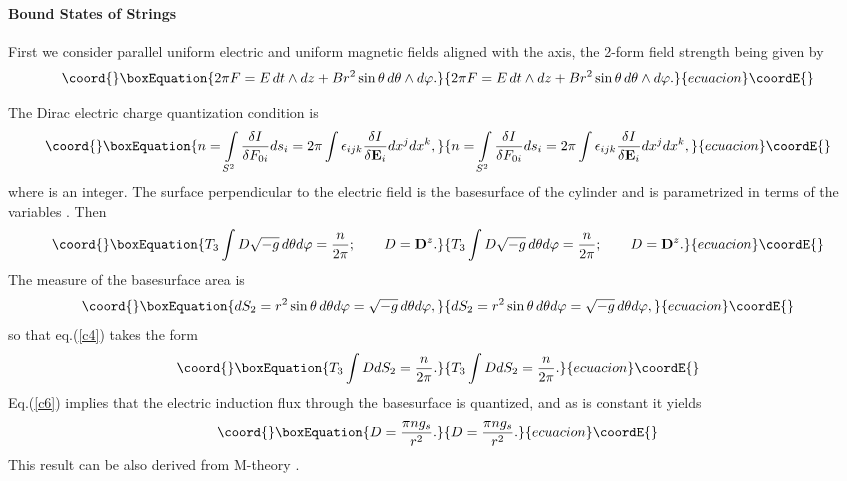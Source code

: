 \documentclass[a4paper,12pt]{article}
\begin{document}
\paragraph{Bound States of Strings}

\noindent

First we consider parallel uniform electric and uniform magnetic fields 
aligned with the \coordHE{} axis, the 2-form field strength being given by
\begin{equation}\coord{}\boxEquation{
2\pi F=E\,dt\land dz+Br^2\sin\theta\,d\theta\land d\varphi.
\label{c1}
}{
2\pi F=E\,dt\land dz+Br^2\sin\theta\,d\theta\land d\varphi.
}{ecuacion}\coordE{}\end{equation}

The Dirac electric charge quantization condition is
\begin{equation}\coord{}\boxEquation{
n=\int\limits_{S^2}\frac{\delta I}{\delta F_{0i}}ds_i=
2\pi\int{\epsilon}_{ijk}\frac{\delta I}{\delta {\e}_i}dx^jdx^k,
\label{c2}
}{
n=\int\limits_{S^2}\frac{\delta I}{\delta F_{0i}}ds_i=
2\pi\int{\epsilon}_{ijk}\frac{\delta I}{\delta {\e}_i}dx^jdx^k,
}{ecuacion}\coordE{}\end{equation}
where \coordHE{} is an integer. The surface perpendicular to the electric field is 
the basesurface of the cylinder and is parametrized in terms of the variables 
\myHighlight{$(\theta,\varphi)$}\coordHE{}. Then
\begin{equation}\coord{}\boxEquation{
T_3\int D\sqrt{-g}\,d\theta d\varphi=\frac{n}{2\pi};\qquad 
D={\d}^z.
\label{c4}
}{
T_3\int D\sqrt{-g}\,d\theta d\varphi=\frac{n}{2\pi};\qquad 
D={\d}^z.
}{ecuacion}\coordE{}\end{equation}
The measure of the basesurface area \coordHE{} is
\begin{equation}\coord{}\boxEquation{
dS_2=r^2\sin\theta\,d\theta d\varphi=\sqrt{-g}\,d\theta d\varphi,
\label{c5}
}{
dS_2=r^2\sin\theta\,d\theta d\varphi=\sqrt{-g}\,d\theta d\varphi,
}{ecuacion}\coordE{}\end{equation}
so that eq.(\ref{c4}) takes the form
\begin{equation}\coord{}\boxEquation{
T_3\int DdS_2=\frac{n}{2\pi}. 
\label{c6}
}{
T_3\int DdS_2=\frac{n}{2\pi}. 
}{ecuacion}\coordE{}\end{equation}
Eq.(\ref{c6}) implies that the electric induction flux through the basesurface is quantized, and as \coordHE{} is constant it yields
\begin{equation}\coord{}\boxEquation{
D=\frac{\pi n g_s}{r^2}.
\label{c7}
}{
D=\frac{\pi n g_s}{r^2}.
}{ecuacion}\coordE{}\end{equation}
This result can be also derived from M-theory \cite{10,19}. 
\end{document}
